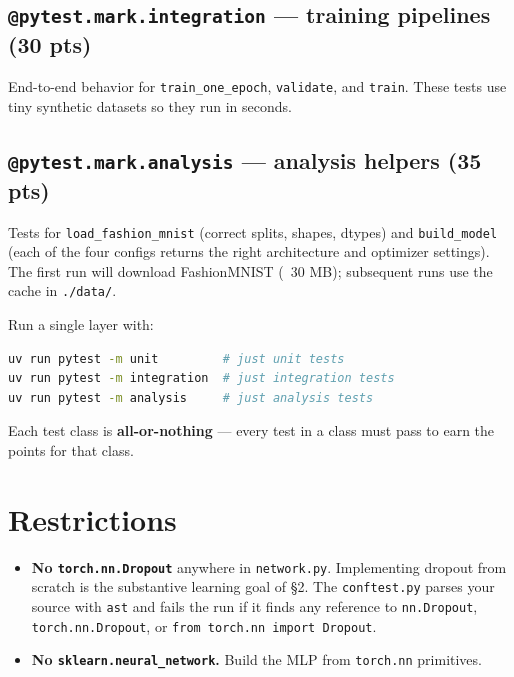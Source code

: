\documentclass[11pt]{article}
\newcommand{\code}[1]{\texttt{\small #1}}
\begin{document}
\subsection*{\texttt{@pytest.mark.integration} --- training pipelines (30 pts)}

End-to-end behavior for \code{train\_one\_epoch}, \code{validate}, and
\code{train}. These tests use tiny synthetic datasets so they run in seconds.

\subsection*{\texttt{@pytest.mark.analysis} --- analysis helpers (35 pts)}

Tests for \code{load\_fashion\_mnist} (correct splits, shapes, dtypes) and
\code{build\_model} (each of the four configs returns the right architecture
and optimizer settings). The first run will download FashionMNIST
(~30 MB); subsequent runs use the cache in \code{./data/}.

\medskip
\noindent
Run a single layer with:

\begin{lstlisting}[language=bash]
uv run pytest -m unit         # just unit tests
uv run pytest -m integration  # just integration tests
uv run pytest -m analysis     # just analysis tests
\end{lstlisting}

\medskip
\noindent
Each test class is \textbf{all-or-nothing} --- every test in a class must
pass to earn the points for that class.

\section{Restrictions}

\begin{itemize}
    \item \textbf{No \code{torch.nn.Dropout}} anywhere in \code{network.py}.
          Implementing dropout from scratch is the substantive learning goal
          of §2. The \code{conftest.py} parses your source with \code{ast}
          and fails the run if it finds any reference to \code{nn.Dropout},
          \code{torch.nn.Dropout}, or \code{from torch.nn import Dropout}.
    \item \textbf{No \code{sklearn.neural\_network}.} Build the MLP from
          \code{torch.nn} primitives.
\end{itemize}
\end{document}
